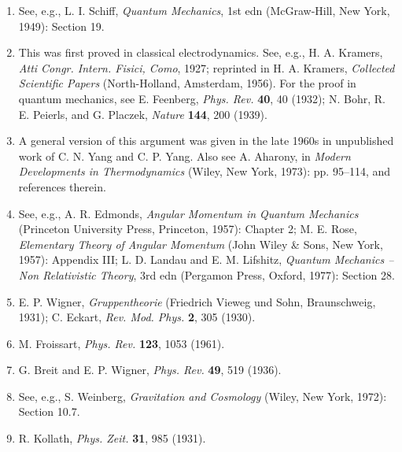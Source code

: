 \begin{enumerate}
\item[21.] \label{ref:3.21}See, e.g., L. I. Schiff, \emph{Quantum Mechanics}, 1st edn
  (McGraw-Hill, New York, 1949): Section 19.

\item[22.] \label{ref:3.22}This was first proved in classical electrodynamics. See, e.g.,
  H. A. Kramers, \emph{Atti Congr. Intern. Fisici, Como}, 1927; reprinted in
  H. A. Kramers, \emph{Collected Scientific Papers} (North-Holland,
  Amsterdam, 1956). For the proof in quantum mechanics, see E. Feenberg,
  \emph{Phys. Rev.} \textbf{40}, 40 (1932); N. Bohr, R. E. Peierls, and
  G. Placzek, \emph{Nature} \textbf{144}, 200 (1939).

\item[23.] \label{ref:3.23}A general version of this argument was given in the late 1960s in
  unpublished work of C. N. Yang and C. P. Yang. Also see A. Aharony, in
  \emph{Modern Developments in Thermodynamics} (Wiley, New York, 1973):
  pp. 95--114, and references therein.

\item[24.] \label{ref:3.24}See, e.g., A. R. Edmonds, \emph{Angular Momentum in Quantum
  Mechanics} (Princeton University Press, Princeton, 1957): Chapter 2;
  M. E. Rose, \emph{Elementary Theory of Angular Momentum} (John Wiley \&
  Sons, New York, 1957): Appendix III; L. D. Landau and E. M. Lifshitz,
  \emph{Quantum Mechanics -- Non Relativistic Theory}, 3rd edn (Pergamon
  Press, Oxford, 1977): Section 28.

\item[25.] \label{ref:3.25}E. P. Wigner, \emph{Gruppentheorie} (Friedrich Vieweg und Sohn,
  Braunschweig, 1931); C. Eckart, \emph{Rev. Mod. Phys.} \textbf{2}, 305
  (1930).

\item[26.] \label{ref:3.26}M. Froissart, \emph{Phys. Rev.} \textbf{123}, 1053 (1961).

\item[27.] \label{ref:3.27}G. Breit and E. P. Wigner, \emph{Phys. Rev.} \textbf{49}, 519
  (1936).

\item[28.] \label{ref:3.28}See, e.g., S. Weinberg, \emph{Gravitation and Cosmology} (Wiley,
  New York, 1972): Section 10.7.

\item[29.] \label{ref:3.29}R. Kollath, \emph{Phys. Zeit.} \textbf{31}, 985 (1931).
\end{enumerate}
